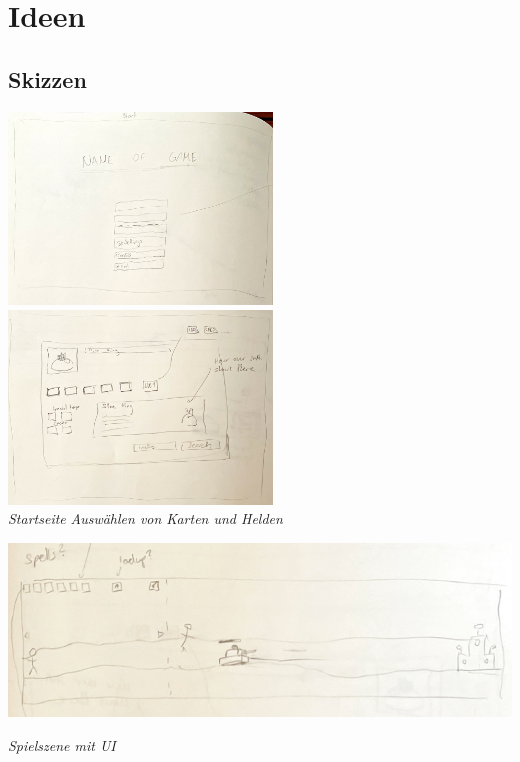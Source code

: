\chapter{Ideen}

\section{Skizzen}

\includegraphics*[width=7cm]{resources/SK_startpage.png} \quad \includegraphics*[width=7cm]{resources/SK_auswahl.png}\\
\textit{Startseite} \qquad \qquad \qquad \qquad \qquad \qquad \qquad \quad \textit{Auswählen von Karten und Helden}
\\
\begin{center}
    \includegraphics*[width=14.5cm]{resources/sk_gamemain.png}\\
\end{center}
\textit{Spielszene mit UI}

